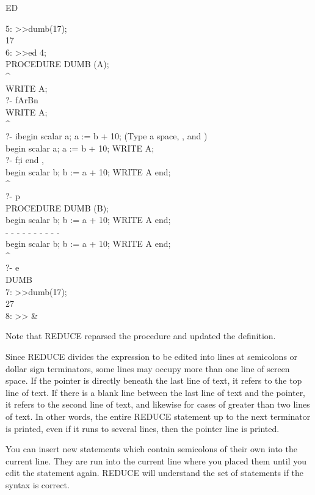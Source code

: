 \begin{Command}[ed]{ED}
\begin{Examples}
5: >>dumb(17); \\
17 \\
6: >>ed 4; \\
  PROCEDURE DUMB (A); \\
  ^ \\
WRITE A; \\
?- fArBn \\
  WRITE A; \\
  ^ \\
?- ibegin scalar a; a := b + 10; (Type a space, , and ) \\
  begin scalar a; a := b + 10; WRITE A; \\
?- f;i end ,  \\
  begin scalar b; b := a + 10; WRITE A end; \\
					  ^ \\
?- p \\
 PROCEDURE DUMB (B); \\
 begin scalar b; b := a + 10; WRITE A end; \\
 -  -  -  -  -  -  -  -  -  - \\
  begin scalar b; b := a + 10; WRITE A end; \\
					  ^ \\
?- e \\
DUMB \\
7: >>dumb(17); \\
27 \\
8: >> &
\end{Examples}

\begin{Comments}
Note that REDUCE reparsed the procedure  and updated the
definition.

Since REDUCE divides the expression to be edited into lines at semicolons or
dollar sign terminators, some lines may occupy more than one line of screen
space.  If the pointer is directly beneath the last line of text, it
refers to the top line of text.  If there is a blank line between the
last line of text and the pointer, it refers to the second line
of text, and likewise for cases of greater than two lines of text.  In other
words, the entire REDUCE statement up to the next terminator is printed, even 
if it runs to several lines, then the pointer line is printed.  

You can insert new statements which contain semicolons of their own into the 
current line.  They are run into the current line where you placed them 
until you edit the statement again.  REDUCE will understand the set of
statements if the syntax is correct.


\end{Comments}
\end{Command}
